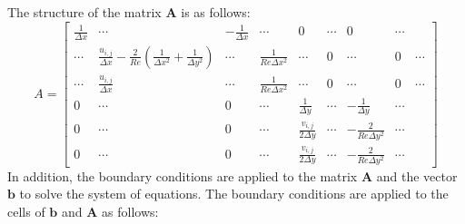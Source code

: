 \documentclass{article}
\begin{document}
The structure of the matrix \( \mathbf{A} \) is as follows:
\[
A = 
\begin{bmatrix}
\frac{1}{\Delta x} & \cdots & -\frac{1}{\Delta x} & \cdots & 0 & \cdots & 0 & \cdots \\
\cdots & \frac{u_{i,j}}{\Delta x} - \frac{2}{Re} \left(\frac{1}{\Delta x^2} + \frac{1}{\Delta y^2}\right) & \cdots & \frac{1}{Re \Delta x^2} & \cdots & 0 & \cdots & 0 & \cdots \\
\cdots & \frac{u_{i,j}}{\Delta x} & \cdots & \frac{1}{Re \Delta x^2} & \cdots & 0 & \cdots & 0 & \cdots \\
0 & \cdots & 0 & \cdots & \frac{1}{\Delta y} & \cdots & -\frac{1}{\Delta y} & \cdots \\
0 & \cdots & 0 & \cdots & \frac{v_{i,j}}{2\Delta y} & \cdots & -\frac{2}{Re \Delta y^2} & \cdots \\
0 & \cdots & 0 & \cdots & \frac{v_{i,j}}{2\Delta y} & \cdots & -\frac{2}{Re \Delta y^2} & \cdots
\end{bmatrix}
\]
In addition, the boundary conditions are applied to the matrix \( \mathbf{A} \) and the vector \( \mathbf{b} \) to solve the system of equations.
The boundary conditions are applied to the cells of \( \mathbf{b} \) and \( \mathbf{A} \) as follows:
\end{document}
